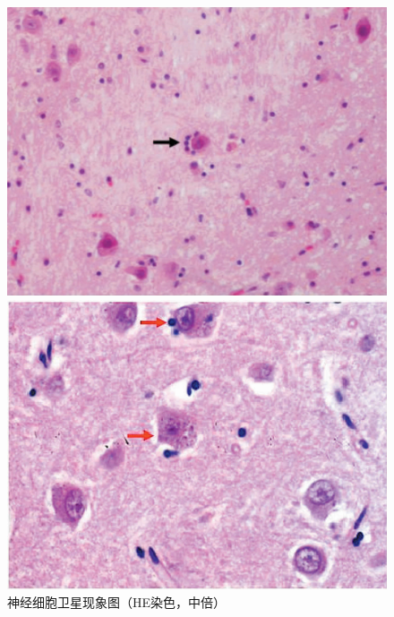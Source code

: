 \begin{figure}[!htbp]
	\centering
	\begin{minipage}[b]{0.45\textwidth}
		\includegraphics{./images/Image00218.jpg}
 \captionsetup{justification=centering}
 \caption{神经细胞卫星现象图（HE染色，中倍）}
 \label{fig13-2}
	\end{minipage}
	\hspace{0.04\textwidth}%
	\begin{minipage}[b]{0.45\textwidth}
		\includegraphics{./images/Image00219.jpg}
 \captionsetup{justification=centering}

\end{minipage}
\end{figure}
